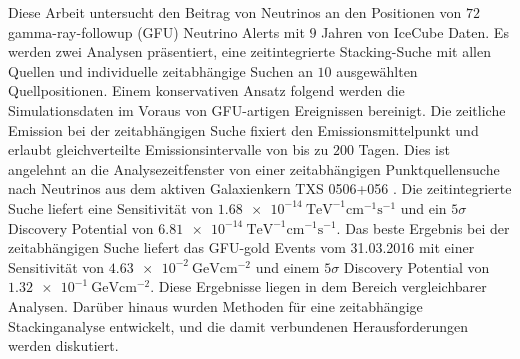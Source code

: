 Diese Arbeit untersucht den Beitrag von Neutrinos an den Positionen von $\num{72}$ gamma-ray-followup (GFU) Neutrino Alerts mit $\num{9}$ Jahren von IceCube Daten.
Es werden zwei Analysen präsentiert, eine zeitintegrierte Stacking-Suche mit allen Quellen und individuelle zeitabhängige Suchen an $\num{10}$ ausgewählten Quellpositionen.
Einem konservativen Ansatz folgend werden die Simulationsdaten im Voraus von GFU-artigen Ereignissen bereinigt.
Die zeitliche Emission bei der zeitabhängigen Suche fixiert den Emissionsmittelpunkt und erlaubt gleichverteilte Emissionsintervalle von bis zu $\num{200}$ Tagen.
Dies ist angelehnt an die Analysezeitfenster von einer zeitabhängigen Punktquellensuche nach Neutrinos aus dem aktiven Galaxienkern TXS 0506+056 \cite{_txs}.
Die zeitintegrierte Suche liefert eine Sensitivität von $\SI{1.68e-14}{\tera\electronvolt\tothe{-1}\centi\meter\tothe{-1}\second\tothe{-1}}$ und ein $\num{5}\sigma$ Discovery Potential von $\SI{6.81e-14}{\tera\electronvolt\tothe{-1}\centi\meter\tothe{-1}\second\tothe{-1}}$.
Das beste Ergebnis bei der zeitabhängigen Suche liefert das GFU-gold Events vom 31.03.2016 mit einer Sensitivität von $\SI{4.63e-2}{\giga\electronvolt\centi\meter\tothe{-2}}$ und einem $\num{5}\sigma$ Discovery Potential von $\SI{1.32e-1}{\giga\electronvolt\centi\meter\tothe{-2}}$.
Diese Ergebnisse liegen in dem Bereich vergleichbarer Analysen.
Darüber hinaus wurden Methoden für eine zeitabhängige Stackinganalyse entwickelt, und die damit verbundenen Herausforderungen werden diskutiert.
